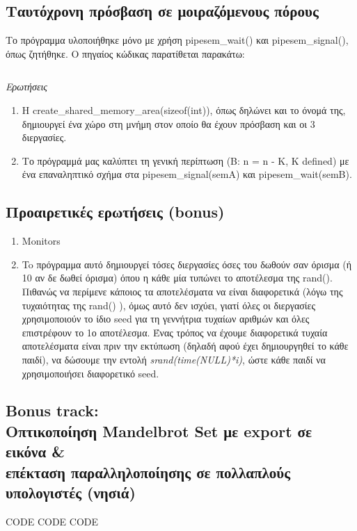 \documentclass[a4paper,10pt]{article} \usepackage{anysize}
\begin{document}
\pagebreak

\subsection{Ταυτόχρονη πρόσβαση σε μοιραζόμενους πόρους} 
Το πρόγραμμα υλοποιήθηκε μόνο με χρήση pipesem\_wait() και pipesem\_signal(), όπως ζητήθηκε.
Ο πηγαίος κώδικας παρατίθεται παρακάτω:
\inputminted[linenos,fontsize=\footnotesize,frame=leftline]{c}{files/procs-shm.c}
\newpage

\emph{Ερωτήσεις}
\begin{enumerate}
\item Η create\_shared\_memory\_area(sizeof(int)), όπως δηλώνει και το όνομά της, δημιουργεί ένα χώρο στη μνήμη στον οποίο θα έχουν πρόσβαση και οι 3
διεργασίες.
\item Το πρόγραμμά μας καλύπτει τη γενική περίπτωση (Β: n = n - K,  K defined) με ένα επαναληπτικό σχήμα στα pipesem\_signal(semA) και 
pipesem\_wait(semB).
\end{enumerate}

\subsection{Προαιρετικές ερωτήσεις (bonus)} 

\begin{enumerate}
\item Monitors

\item To πρόγραμμα αυτό δημιουργεί τόσες διεργασίες όσες του δωθούν σαν όρισμα (ή 10 αν δε δωθεί όρισμα) όπου η κάθε μία τυπώνει το αποτέλεσμα 
της rand(). Πιθανώς να περίμενε κάποιος τα αποτελέσματα να είναι διαφορετικά (λόγω της τυχαιότητας της rand() ), όμως αυτό δεν ισχύει, γιατί όλες οι διεργασίες χρησιμοποιούν το ίδιο seed για τη γεννήτρια τυχαίων αριθμών και όλες επιστρέφουν το 1ο αποτέλεσμα.
Ένας τρόπος να έχουμε διαφορετικά τυχαία αποτελέσματα είναι πριν την εκτύπωση (δηλαδή αφού έχει δημιουργηθεί το κάθε παιδί), να δώσουμε την εντολή 
\emph{srand(time(NULL)*i)}, ώστε κάθε παιδί να χρησιμοποιήσει διαφορετικό seed.   
\end{enumerate}

\subsection{Bonus track: \\Οπτικοποίηση Mandelbrot Set με export σε εικόνα \& \\επέκταση παραλληλοποίησης σε πολλαπλούς υπολογιστές (νησιά)}
CODE CODE CODE
\end{document}
